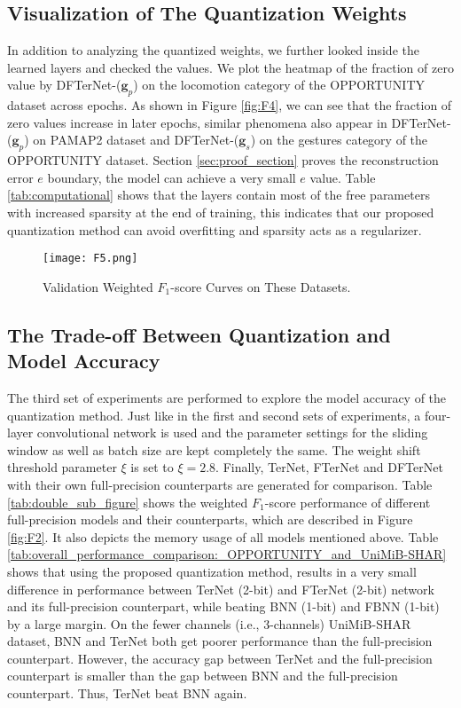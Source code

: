 \documentclass[twoside,twocolumn]{article}
\begin{document}
\subsection{Visualization of The Quantization Weights}
In addition to analyzing the quantized weights, we further looked inside the learned layers and checked the values.
We plot the heatmap of the fraction of zero value by DFTerNet-($\boldsymbol{g}_p$) on the locomotion category of the OPPORTUNITY dataset across epochs. As shown in Figure \ref{fig:F4}, we can see that the fraction of zero values increase in later epochs, similar phenomena also appear in DFTerNet-($\boldsymbol{g}_p$) on PAMAP2 dataset and DFTerNet-($\boldsymbol{g}_s$) on the gestures category of the OPPORTUNITY dataset. Section \ref{sec:proof_section} proves the reconstruction error $e$ boundary, the model can achieve a very small $e$ value. Table \ref{tab:computational} shows that the layers contain most of the free parameters with increased sparsity at the end of training, this indicates that our proposed quantization method can avoid overfitting and sparsity acts as a regularizer.

\begin{figure*}
  \centering
  \texttt{[image: F5.png]}\\
  \caption{Validation Weighted $F_1$-score Curves on These Datasets.}\label{fig:F5}
\end{figure*}

\subsection{The Trade-off Between Quantization and Model Accuracy}
The third set of experiments are performed to explore the model accuracy of the quantization method. Just like in the first and second sets of experiments, a four-layer convolutional network is used and the parameter settings for the sliding window as well as batch size are kept completely the same. The weight shift threshold parameter $\xi$ is set to $\xi=2.8$. Finally, TerNet, FTerNet and DFTerNet with their own full-precision counterparts are generated for comparison. Table \ref{tab:double_sub_figure} shows the weighted $F_1$-score performance of different full-precision models and their counterparts, which are described in Figure \ref{fig:F2}. It also depicts the memory usage of all models mentioned above. Table \ref{tab:overall_performance_comparison:_OPPORTUNITY_and_UniMiB-SHAR} shows that using the proposed quantization method, results in a very small difference in performance between TerNet (2-bit) and FTerNet (2-bit) network and its full-precision counterpart, while beating BNN (1-bit) and FBNN (1-bit) by a large margin. On the fewer channels (i.e., 3-channels) UniMiB-SHAR dataset, BNN and TerNet both get poorer performance than the full-precision counterpart. However, the accuracy gap between TerNet and the full-precision counterpart is smaller than the gap between BNN and the full-precision counterpart. Thus, TerNet beat BNN again.
\end{document}
